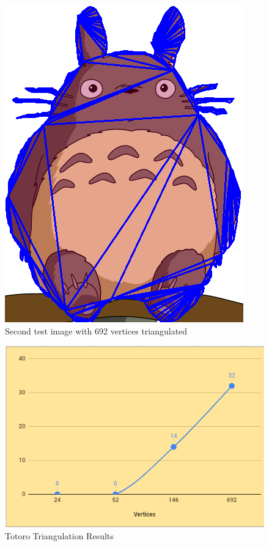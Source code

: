 \documentclass[conference]{IEEEtran}
\begin{document}
\begin{figure}
  \centering
    \includegraphics[scale=0.3]{totoro692Triangulated}
    \caption{Second test image with 692 vertices triangulated}
\end{figure}
\begin{figure}
    \centering
    \includegraphics[scale=0.6]{totoroGraph}
    \caption{Totoro Triangulation Results}
    \label{fig:graphtotoro}
\end{figure}



\end{document}

